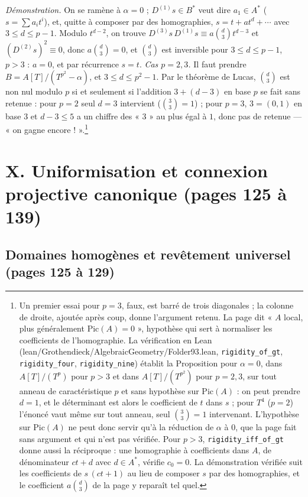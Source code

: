 \documentclass[11pt,a4paper]{article}
\begin{document}
\emph{Démonstration.} On se ramène à $\alpha = 0$ ; $D^{(1)}s \in B^*$ veut dire
$a_1 \in A^*$ ($s = \sum a_i t^i$), et, quitte à composer par des
homographies, $s = t + a t^d + \cdots$ avec $3 \leq d \leq p - 1$. Modulo
$t^{d-2}$, on trouve $D^{(3)}s\,D^{(1)}s \equiv a\binom{d}{3}t^{d-3}$ et
$(D^{(2)}s)^2 \equiv 0$, donc $a\binom d3 = 0$, et $\binom d3$ est inversible
pour $3 \leq d \leq p-1$, $p > 3$ : $a = 0$, et par récurrence $s = t$.
\emph{Cas $p = 2, 3$.} Il faut prendre $B = A[T]/(T^{p^2} - \alpha)$, et
$3 \leq d \leq p^2 - 1$. Par le théorème de Lucas, $\binom d3$ est non nul
modulo $p$ si et seulement si l'addition $3 + (d-3)$ en base $p$ se fait sans
retenue : pour $p = 2$ seul $d = 3$ intervient ($\binom33 = 1$) ; pour $p = 3$,
$3 = (0,1)$ en base $3$ et $d - 3 \leq 5$ a un chiffre des « $3$ » au plus égal
à $1$, donc pas de retenue — « on gagne encore ! ».\footnote{Un premier essai
pour $p = 3$, faux, est barré de trois diagonales ; la colonne de droite,
ajoutée après coup, donne l'argument retenu. La page dit « $A$ local, plus
généralement $\mathrm{Pic}(A) = 0$ », hypothèse qui sert à normaliser les
coefficients de l'homographie. La vérification en Lean
(lean/Grothendieck/AlgebraicGeometry/Folder93.lean, \texttt{rigidity\_of\_gt},
\texttt{rigidity\_four}, \texttt{rigidity\_nine}) établit la Proposition
pour $\alpha = 0$, dans $A[T]/(T^p)$ pour $p > 3$ et dans $A[T]/(T^{p^2})$
pour $p = 2, 3$, sur tout anneau de caractéristique $p$ et sans hypothèse sur
$\mathrm{Pic}(A)$ : on peut prendre $d = 1$, et le déterminant est alors le
coefficient de $t$ dans $s$ ; pour $T^4$ ($p = 2$) l'énoncé vaut même sur
tout anneau, seul $\binom33 = 1$ intervenant. L'hypothèse sur
$\mathrm{Pic}(A)$ ne peut donc servir qu'à la réduction de $\alpha$ à $0$,
que la page fait sans argument et qui n'est pas vérifiée. Pour $p > 3$,
\texttt{rigidity\_iff\_of\_gt} donne aussi la réciproque : une homographie à
coefficients dans $A$, de dénominateur $ct + d$ avec $d \in A^*$, vérifie
$c_0 = 0$. La démonstration vérifiée suit les coefficients de
$s\,(ct + 1)$ au lieu de composer $s$ par des homographies, et le
coefficient $a\binom d3$ de la page y reparaît tel quel.}

\section*{X. Uniformisation et connexion projective canonique (pages 125 à 139)}

\subsection*{Domaines homogènes et revêtement universel (pages 125 à 129)}
\end{document}
